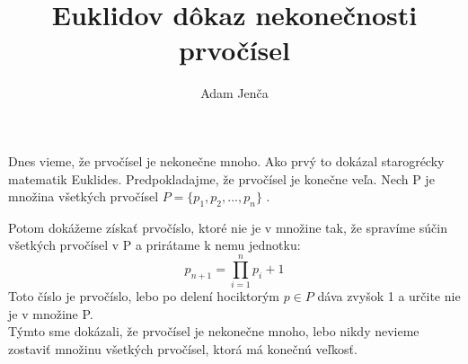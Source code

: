 \documentclass{article}
\title{Euklidov dôkaz nekonečnosti prvočísel}
\author{Adam Jenča}
\begin{document}
{{\maketitle}}
Dnes vieme, že prvočísel je nekonečne mnoho.
Ako prvý to dokázal starogrécky matematik Euklides.
Predpokladajme, že prvočísel je konečne veľa.
Nech P je množina všetkých prvočísel $P=\{p_1,p_2,...,p_n\}$ .

Potom dokážeme získať prvočíslo, ktoré nie je v množine tak, že spravíme súčin všetkých prvočísel v P a prirátame k nemu jednotku:
\[
p_{n+1}= \prod_{i=1}^n p_i+1
\]
\noindent
Toto číslo je prvočíslo, lebo po delení hociktorým $p \in P$ dáva zvyšok 1 a určite nie je v množine P.\\
Týmto sme dokázali, že prvočísel je nekonečne mnoho, lebo nikdy nevieme zostaviť množinu všetkých prvočísel, ktorá má konečnú veľkosť.
\end{document}
